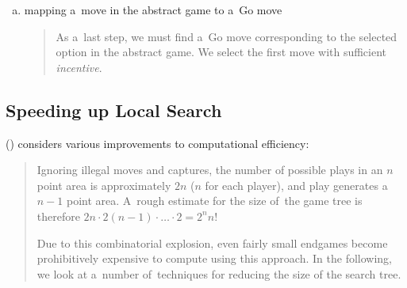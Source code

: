\begin{enumerate}[(a)]
  \item mapping a~move in the abstract game to a~Go move
    \begin{quotation}
      As a~last step, we must find a~Go move corresponding to the selected option in the abstract game.
      We select the first move with sufficient \emph{incentive}.
    \end{quotation}
\end{enumerate}

\subsection{Speeding up Local Search}

(\cite{Muller1995computer}) considers various improvements to computational efficiency:
\begin{quotation}
  Ignoring illegal moves and captures, the number of possible plays in an $n$ point area is approximately $2n$ ($n$ for each player), and play generates a $n-1$ point area.
  A~rough estimate for the size of~the game tree is therefore $2n\cdot2(n-1)\cdot \ldots \cdot2 = 2^n n!$

  Due to this combinatorial explosion, even fairly small endgames become prohibitively expensive to compute using this approach.
  In the following, we look at a~number of~techniques for reducing the size of the search tree.
\end{quotation}

